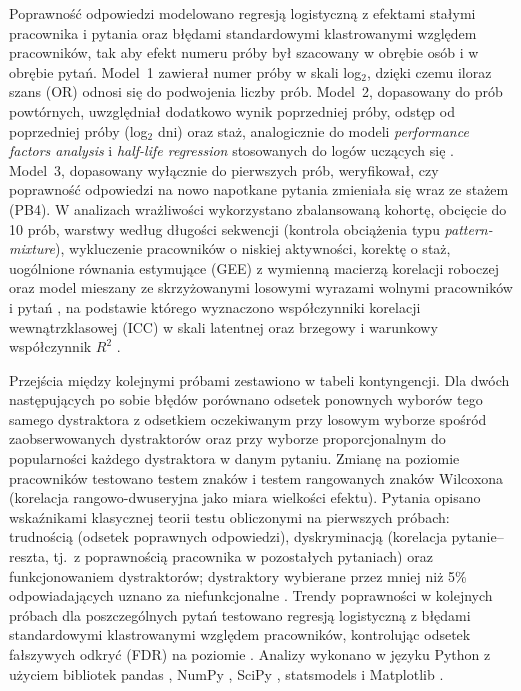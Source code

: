 Poprawność odpowiedzi modelowano regresją logistyczną z efektami stałymi pracownika i pytania oraz
błędami standardowymi klastrowanymi względem pracowników, tak aby efekt numeru próby był szacowany
w obrębie osób i w obrębie pytań. Model~1 zawierał numer próby w skali log$_2$, dzięki czemu iloraz
szans (OR) odnosi się do podwojenia liczby prób. Model~2, dopasowany do prób powtórnych, uwzględniał
dodatkowo wynik poprzedniej próby, odstęp od poprzedniej próby (log$_2$ dni) oraz staż, analogicznie
do modeli \emph{performance factors analysis} i \emph{half-life regression} stosowanych do logów
uczących się \citep{pavlik2009,settles2016}. Model~3, dopasowany wyłącznie do pierwszych prób,
weryfikował, czy poprawność odpowiedzi na nowo napotkane pytania zmieniała się wraz ze stażem (PB4).
W analizach wrażliwości wykorzystano zbalansowaną kohortę, obcięcie do 10 prób, warstwy według długości
sekwencji (kontrola obciążenia typu \emph{pattern-mixture}), wykluczenie pracowników o niskiej
aktywności, korektę o staż, uogólnione równania estymujące (GEE) z wymienną macierzą korelacji
roboczej \citep{liang1986} oraz model mieszany ze skrzyżowanymi losowymi wyrazami wolnymi pracowników
i pytań \citep{baayen2008}, na podstawie którego wyznaczono współczynniki korelacji wewnątrzklasowej
(ICC) w skali latentnej oraz brzegowy i warunkowy współczynnik $R^2$ \citep{nakagawa2013}.

Przejścia między kolejnymi próbami zestawiono w tabeli kontyngencji. Dla dwóch następujących po sobie błędów porównano odsetek ponownych wyborów
tego samego dystraktora z odsetkiem oczekiwanym przy losowym wyborze spośród zaobserwowanych
dystraktorów oraz przy wyborze proporcjonalnym do popularności każdego dystraktora w danym pytaniu.
Zmianę na poziomie pracowników testowano testem znaków i testem rangowanych znaków Wilcoxona
(korelacja rangowo-dwuseryjna jako miara wielkości efektu). Pytania opisano wskaźnikami klasycznej
teorii testu obliczonymi na pierwszych próbach: trudnością (odsetek poprawnych odpowiedzi),
dyskryminacją (korelacja pytanie--reszta, tj.\ z poprawnością pracownika w pozostałych pytaniach) oraz
funkcjonowaniem dystraktorów; dystraktory wybierane przez mniej niż 5\% odpowiadających uznano za
niefunkcjonalne \citep{tarrant2009,gierl2017}. Trendy poprawności w kolejnych próbach dla
poszczególnych pytań testowano regresją logistyczną z błędami standardowymi klastrowanymi względem
pracowników, kontrolując odsetek fałszywych odkryć (FDR) na poziomie \Alpha{} \citep{benjamini1995}.
Analizy wykonano w języku Python \VerPython{} z użyciem bibliotek pandas \VerPandas, NumPy \VerNumpy,
SciPy \VerScipy, statsmodels \VerStatsmodels{} i Matplotlib \VerMatplotlib{}.
